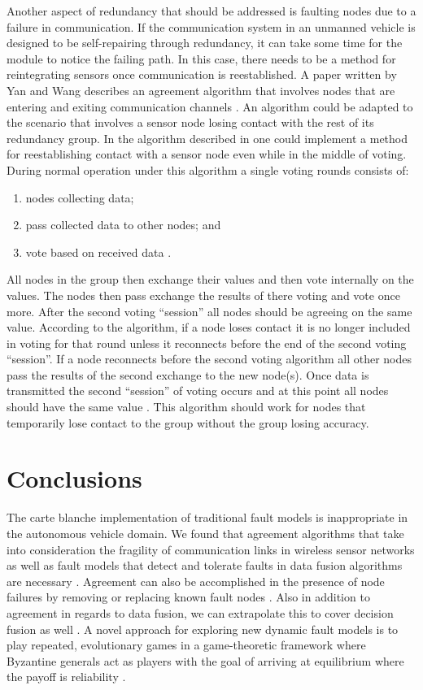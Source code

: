 \documentclass[twoside, conference]{IEEEtran}%
\begin{document}
Another aspect of redundancy that should be addressed is faulting nodes due to a failure in communication. If the communication system in an unmanned vehicle is designed to be self-repairing through redundancy, it can take some time for the module to notice the failing path. In this case, there needs to be a method for reintegrating sensors once communication is reestablished. A paper written by Yan and Wang describes an agreement algorithm that involves nodes that are entering and exiting communication channels \cite{Yan2007}. An algorithm could be adapted to the scenario that involves a sensor node losing contact with the rest of its redundancy group. In the algorithm described in \cite{Yan2007} one could implement a method for reestablishing contact with a sensor node even while in the middle of voting. During normal operation under this algorithm a single voting rounds consists of:
\begin{enumerate}
	\item nodes collecting data;
	\item pass collected data to other nodes; and
	\item vote based on received data \cite{Yan2007}.
\end{enumerate} 
All nodes in the group then exchange their values and then vote internally on the values. The nodes then pass exchange the results of there voting and vote once more. After the second voting ``session'' all nodes should be agreeing on the same value. According to the algorithm, if a node loses contact it is no longer included in voting for that round unless it reconnects before the end of the second voting ``session''. If a node reconnects before the second voting algorithm all other nodes pass the results of the second exchange to the new node(s). Once data is transmitted the second ``session'' of voting occurs and at this point all nodes should have the same value \cite{Yan2007}. This algorithm should work for nodes that temporarily lose contact to the group without the group losing accuracy.

\section{Conclusions}\label{sec:conclusions}
The carte blanche implementation of traditional fault models is inappropriate in the autonomous vehicle domain.  We found that agreement algorithms that take into consideration the fragility of communication links in wireless sensor networks as well as fault models that detect and tolerate faults in data fusion algorithms are necessary \cite{Biely2007,Bader2014}.  Agreement can also be accomplished in the presence of node failures by removing or replacing known fault nodes \cite{Ren2001}.  Also in addition to agreement in regards to data fusion, we can extrapolate this to cover decision fusion as well \cite{Clouqueur2004}.  A novel approach for exploring new dynamic fault models is to play repeated, evolutionary games in a game-theoretic framework where Byzantine generals act as players with the goal of arriving at equilibrium where the payoff is reliability \cite{Ma2008}.



\end{document}
